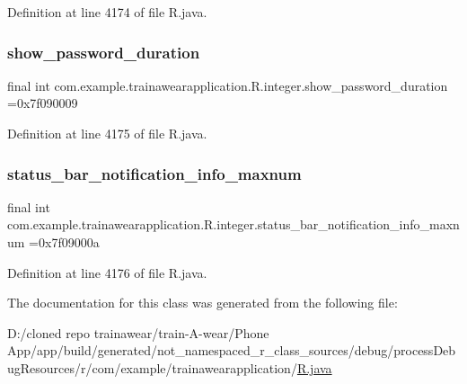 Definition at line 4174 of file R.\+java.

\mbox{\label{classcom_1_1example_1_1trainawearapplication_1_1_r_1_1integer_a8b8d4e7c1ea962ec309ce7de5a22f7d3}} 
\subsubsection{\texorpdfstring{show\_password\_duration}{show\_password\_duration}}
{\footnotesize\ttfamily final int com.\+example.\+trainawearapplication.\+R.\+integer.\+show\+\_\+password\+\_\+duration =0x7f090009\hspace{0.3cm}{\ttfamily [static]}}



Definition at line 4175 of file R.\+java.

\mbox{\label{classcom_1_1example_1_1trainawearapplication_1_1_r_1_1integer_a4b9201aa0cdb2d6fc17f3d7d13229650}} 
\subsubsection{\texorpdfstring{status\_bar\_notification\_info\_maxnum}{status\_bar\_notification\_info\_maxnum}}
{\footnotesize\ttfamily final int com.\+example.\+trainawearapplication.\+R.\+integer.\+status\+\_\+bar\+\_\+notification\+\_\+info\+\_\+maxnum =0x7f09000a\hspace{0.3cm}{\ttfamily [static]}}



Definition at line 4176 of file R.\+java.



The documentation for this class was generated from the following file\+:\begin{DoxyCompactItemize}
\item 
D\+:/cloned repo trainawear/train-\/\+A-\/wear/\+Phone App/app/build/generated/not\+\_\+namespaced\+\_\+r\+\_\+class\+\_\+sources/debug/process\+Debug\+Resources/r/com/example/trainawearapplication/\mbox{\hyperlink{process_debug_resources_2r_2com_2example_2trainawearapplication_2_r_8java}{R.\+java}}\end{DoxyCompactItemize}
